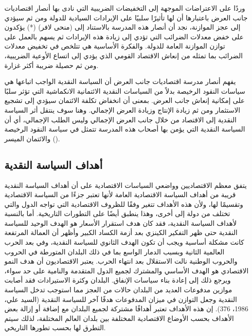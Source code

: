 \documentclass[10pt,a4paper]{report}
\begin{document}
\begin{doublespacing}
وردًا على الاعتراضات الموجهة إلى التخفيضات الضريبية التي نادى بها أنصار اقتصاديات جانب العرض باعتبارها أن لها تأثيرًا سلبيًا على الإيرادات السيادية للدولة ومن ثم سيؤدي إلى عجز الموازنة، نجد أن أنصار هذه المدرسة بالاستناد إلى ({منحى لافر}) (*) يؤكدون على خفض معدلات الضرائب التي تؤدي إلى زيادة هذه الإيرادات ثم يسهم بالعمل على توازن الموازنة العامة للدولة. والفكرة الأساسية هي تتلخص في تخفيض معدلات الضرائب بما تمثله من إنعاش الاقتصاد القومي الذي يؤدي إلى اتساع الأوعية الضريبية، ومن ثم حصيلة ضريبة أكثر غزارة. 

يفهم أنصار مدرسة اقتصاديات جانب العرض أن السياسة النقدية الواجب اتباعها هي سياسات النقود الرخيصة بدلاً من السياسات النقدية الائتمانية الانكماشية التي تؤثر سلبًا على إمكانية إنعاش جانب العرض. بمعنى أن انخفاض تكلفة الائتمان سيؤدي إلى تشجيع الاستثمار ومن ثم زيادة الإنتاج وزيادة العرض الإجمالي. وهنا سوف ينتقل أثر السياسة النقدية إلى الاقتصاد من خلال جانب العرض الإجمالي وليس الطلب الإجمالي، أي أن السياسة النقدية التي يؤمن بها أصحاب هذه المدرسة تتمثل في سياسة النقود الرخيصة والائتمان الميسر ().
\subsection{أهداف السياسة النقدية}
يتفق معظم الاقتصاديين وواضعي السياسات الاقتصادية على أن أهداف السياسة النقدية قريبة من أهداف السياسة الاقتصادية العامة لأنها تعتبر جزءًا من السياسة الاقتصادية وتقسيمًا لها، ولأن هذه الأهداف تتغير وفقًا للظروف الاقتصادية التي تواجه الدول والتي تختلف من دولة إلى أخرى، وهذا ينطبق أيضًا على التطورات التاريخية. أما بالنسبة لأهداف السياسة النقدية، فقد كان هدف استقرار الأسعار هو الهدف الوحيد للسياسة النقدية حتى ظهر التفكير الكينزي بعد أزمة الكساد الكبير وأظهر أن العمالة المرتفعة كانت مشكلة أساسية ويجب أن تكون الهدف الثانوي للسياسة النقدية، وفي بعد الحرب العالمية الثانية وبسبب الدمار الواسع بما في ذلك البلدان المتورطة في الحروب والحروب الوطنية نالت الاستقلال بعد انتهاء الحرب. يعتبر الاقتصاديون أن هدف النمو الاقتصادي هو الهدف الأساسي والمشترك لجميع الدول المتقدمة والنامية على حد سواء، ويرجع ذلك إلى إعادة بناء سياسات الإنفاق. البلدان وكثرة الاستيرادات فقد أصابت موازين مدفوعات العديد من البلدان حالات من العجز مما استوجب تدخل السياسة النقدية وجعل التوازن في ميزان المدفوعات هدفًا آخر للسياسة النقدية ({السيد علي، 1986، 376}). إن هذه الأهداف تعتبر أهدافًا مشتركة لجميع البلدان مع إضافة أو إزالة بعض الأهداف بحسب الأوضاع الاقتصادية المختلفة بين بلدان العالم المختلفة، لذلك سيتم التطرق لها بحسب تطورها التاريخي.

\end{doublespacing}
\end{document}
